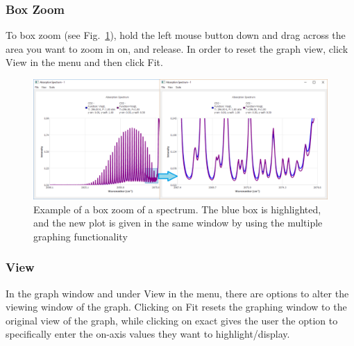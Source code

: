 \documentclass[12pt]{article}
\begin{document}
\subsubsection*{Box Zoom}
To box zoom  (see Fig.~\ref{fig:graph_tab}), hold the left mouse button down and drag across the area you want to zoom in on, and release. In order to reset the graph view, click View in the menu and then click Fit.
\begin{figure}[h]
\centering
\includegraphics[scale = 0.4]{GraphBoxZoomBoth}
\caption{Example of a box zoom of a spectrum. The blue box is highlighted, and the new plot is given in the same window by using the multiple graphing functionality}
\label{fig:graph_tab}
\end{figure}

\subsubsection*{View}
In the graph window and under View in the menu, there are options to alter the viewing window of the graph. Clicking on Fit resets the graphing window to the original view of the graph, while clicking on exact gives the user the option to specifically enter the on-axis values they want to highlight/display.

\end{document}
